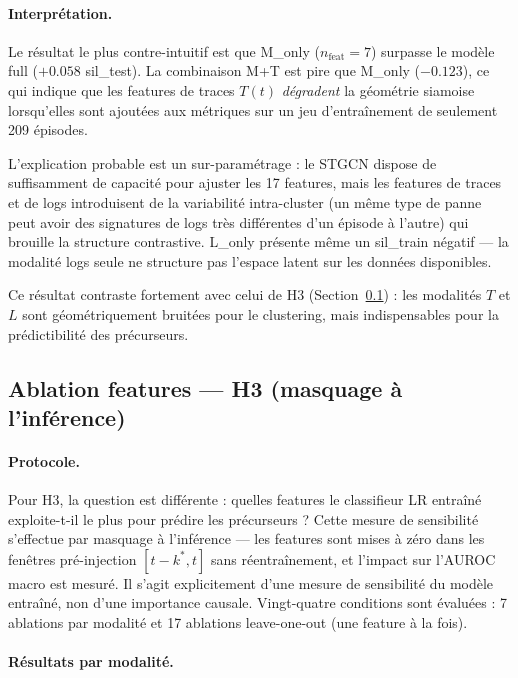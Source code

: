 \paragraph{Interprétation.}
Le résultat le plus contre-intuitif est que M\_only ($n_\text{feat} = 7$) surpasse
le modèle full ($+0.058$ sil\_test). La combinaison M+T est pire que M\_only ($-0.123$),
ce qui indique que les features de traces $T(t)$ \emph{dégradent} la géométrie siamoise
lorsqu'elles sont ajoutées aux métriques sur un jeu d'entraînement de seulement 209 épisodes.

L'explication probable est un sur-paramétrage : le STGCN dispose de suffisamment de
capacité pour ajuster les 17 features, mais les features de traces et de logs introduisent
de la variabilité intra-cluster (un même type de panne peut avoir des signatures de logs
très différentes d'un épisode à l'autre) qui brouille la structure contrastive.
L\_only présente même un sil\_train négatif --- la modalité logs seule ne structure pas
l'espace latent sur les données disponibles.

Ce résultat contraste fortement avec celui de H3 (Section~\ref{sec:ablation_h3}) :
les modalités $T$ et $L$ sont géométriquement bruitées pour le clustering, mais
indispensables pour la prédictibilité des précurseurs.

\subsection{Ablation features --- H3 (masquage à l'inférence)}
\label{sec:ablation_h3}

\paragraph{Protocole.}
Pour H3, la question est différente : quelles features le classifieur LR entraîné
exploite-t-il le plus pour prédire les précurseurs ? Cette mesure de sensibilité
s'effectue par masquage à l'inférence --- les features sont mises à zéro dans les
fenêtres pré-injection $[t-k^*, t]$ sans réentraînement, et l'impact sur l'AUROC macro
est mesuré. Il s'agit explicitement d'une mesure de sensibilité du modèle entraîné,
non d'une importance causale.
Vingt-quatre conditions sont évaluées : 7 ablations par modalité et 17 ablations
leave-one-out (une feature à la fois).

\paragraph{Résultats par modalité.}

